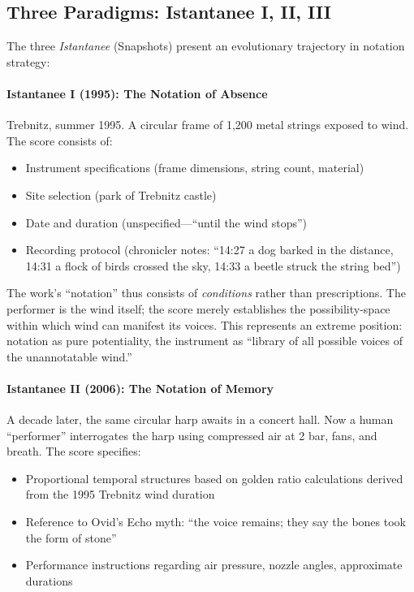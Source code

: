 \subsection{Three Paradigms: Istantanee I, II, III}

The three \emph{Istantanee} (Snapshots) present an evolutionary trajectory in 
notation strategy:

\paragraph{Istantanee I (1995): The Notation of Absence}
Trebnitz, summer 1995. A circular frame of 1,200 metal strings exposed to wind. 
The score consists of:
\begin{itemize}
  \item Instrument specifications (frame dimensions, string count, material)
  \item Site selection (park of Trebnitz castle)
  \item Date and duration (unspecified---``until the wind stops'')
  \item Recording protocol (chronicler notes: ``14:27 a dog barked in the 
  distance, 14:31 a flock of birds crossed the sky, 14:33 a beetle struck the 
  string bed'')
\end{itemize}

The work's ``notation'' thus consists of \emph{conditions} rather than 
prescriptions. The performer is the wind itself; the score merely establishes 
the possibility-space within which wind can manifest its voices. This represents 
an extreme position: notation as pure potentiality, the instrument as 
``library of all possible voices of the unannotatable wind.''

\paragraph{Istantanee II (2006): The Notation of Memory}
A decade later, the same circular harp awaits in a concert hall. Now a human 
``performer'' interrogates the harp using compressed air at 2 bar, fans, and 
breath. The score specifies:
\begin{itemize}
  \item Proportional temporal structures based on golden ratio calculations 
  derived from the 1995 Trebnitz wind duration
  \item Reference to Ovid's Echo myth: ``the voice remains; they say the bones 
  took the form of stone''
  \item Performance instructions regarding air pressure, nozzle angles, 
  approximate durations
\end{itemize}

